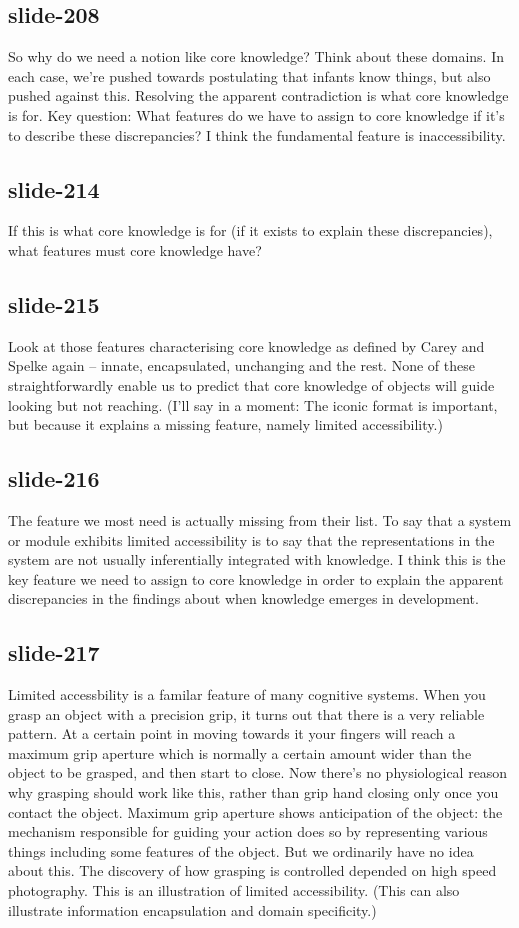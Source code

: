 \documentclass[12pt,\papersize]{extarticle}
\begin{document}
 
\subsection{slide-208}
So why do we need a notion like core knowledge?
Think about these domains.
In each case, we're pushed towards postulating that infants know things, but also pushed against this.
Resolving the apparent contradiction is what core knowledge is for.
Key question: What features do we have to assign to core knowledge if it's to describe these discrepancies?
I think the fundamental feature is inaccessibility.
 
 
\subsection{slide-214}
If this is what core knowledge is for (if it exists to explain these discrepancies), what features must core knowledge have?
 
 
\subsection{slide-215}
Look at those features characterising core knowledge as defined by Carey and Spelke again -- innate, encapsulated, unchanging and the rest. None of these straightforwardly enable us to predict that core knowledge of objects will guide looking but not reaching. (I'll say in a moment: The iconic format is important, but because it explains a missing feature, namely limited accessibility.)
 
 
\subsection{slide-216}
The feature we most need is actually missing from their list.
To say that a system or module exhibits limited accessibility is to say that the representations in the system are not usually inferentially integrated with knowledge.
I think this is the key feature we need to assign to core knowledge in order to explain the apparent discrepancies in the findings about when knowledge emerges in development.
 
 
\subsection{slide-217}
Limited accessbility is a familar feature of many cognitive systems.
When you grasp an object with a precision grip, it turns out that there is a very reliable pattern.
At a certain point in moving towards it your fingers will reach a maximum grip aperture which is normally a certain amount wider than the object to be grasped, and then start to close.
Now there's no physiological reason why grasping should work like this, rather than grip hand closing only once you contact the object.
Maximum grip aperture shows anticipation of the object: the mechanism responsible for guiding your action does so by representing various things including some features of the object.
But we ordinarily have no idea about this.
The discovery of how grasping is controlled depended on high speed photography.
This is an illustration of limited accessibility.
(This can also illustrate information encapsulation and domain specificity.)
 
\end{document}
